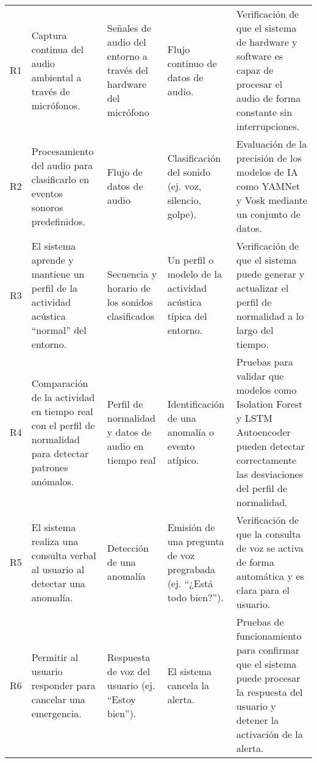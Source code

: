 {\begin{longtable}[c]{c p{3.5cm} p{2.2cm} p{2.2cm} p{3.5cm}}
            R1                     & Captura continua del audio ambiental a través de micrófonos.                                            & Señales de audio del entorno a través del hardware del micrófono & Flujo continuo de datos de audio.                                     & Verificación de que el sistema de hardware y software es capaz de procesar el audio de forma constante sin interrupciones.                         \\
            \addlinespace
            R2                     & Procesamiento del audio para clasificarlo en eventos sonoros predefinidos.                              & Flujo de datos de audio                                          & Clasificación del sonido (ej. voz, silencio, golpe).                  & Evaluación de la precisión de los modelos de IA como YAMNet y Vosk mediante un conjunto de datos.                                                  \\
            \addlinespace
            R3                     & El sistema aprende y mantiene un perfil de la actividad acústica ``normal'' del entorno.                & Secuencia y horario de los sonidos clasificados                  & Un perfil o modelo de la actividad acústica típica del entorno.       & Verificación de que el sistema puede generar y actualizar el perfil de normalidad a lo largo del tiempo.                                           \\
            \addlinespace
            R4                     & Comparación de la actividad en tiempo real con el perfil de normalidad para detectar patrones anómalos. & Perfil de normalidad y datos de audio en tiempo real             & Identificación de una anomalía o evento atípico.                      & Pruebas para validar que modelos como Isolation Forest y LSTM Autoencoder pueden detectar correctamente las desviaciones del perfil de normalidad. \\
            \addlinespace
            R5                     & El sistema realiza una consulta verbal al usuario al detectar una anomalía.                             & Detección de una anomalía                                        & Emisión de una pregunta de voz pregrabada (ej. ``¿Está todo bien?''). & Verificación de que la consulta de voz se activa de forma automática y es clara para el usuario.                                                   \\
            \addlinespace
            R6                     & Permitir al usuario responder para cancelar una emergencia.                                             & Respuesta de voz del usuario (ej. ``Estoy bien'').               & El sistema cancela la alerta.                                         & Pruebas de funcionamiento para confirmar que el sistema puede procesar la respuesta del usuario y detener la activación de la alerta.              \\

\end{longtable}}
